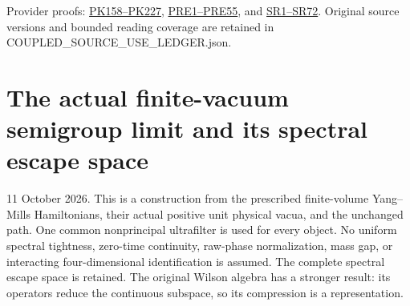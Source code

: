 \documentclass[11pt]{article}
\begin{document}
Provider proofs: \href{https://github.com/KokunoYumeto/yang-mills-interacting-workbench/blob/485b61423c1f4e1805deb453c1b6b342b27842b6/yang-mills/continuations/20260930-s6-ns-moment-map-bridge/PERIOD_COUPLING_AND_PHYSICAL_KERNELS.md}{PK158–PK227}, \href{https://github.com/KokunoYumeto/yang-mills-interacting-workbench/blob/ade565f79be8b0eea8dc8e8a95a4034dde91644f/yang-mills/continuations/20261011-central-signs-shrinking-window/PHASE_RESPONSE_AND_ENDPOINT.md}{PRE1–PRE55}, and \href{https://github.com/KokunoYumeto/yang-mills-interacting-workbench/blob/ade565f79be8b0eea8dc8e8a95a4034dde91644f/yang-mills/continuations/20261011-central-signs-shrinking-window/SQUARE_ROOT_SCORE_RECEIVING_MAPS.md}{SR1–SR72}. Original source versions and bounded reading coverage are retained in COUPLED\_SOURCE\_USE\_LEDGER.json.
\clearpage
\section*{The actual finite-vacuum semigroup limit and its spectral escape space}

11 October 2026. This is a construction from the prescribed finite-volume Yang–Mills Hamiltonians, their actual positive unit physical vacua, and the unchanged path. One common nonprincipal ultrafilter is used for every object. No uniform spectral tightness, zero-time continuity, raw-phase normalization, mass gap, or interacting four-dimensional identification is assumed. The complete spectral escape space is retained. The original Wilson algebra has a stronger result: its operators reduce the continuous subspace, so its compression is a representation.
\end{document}
